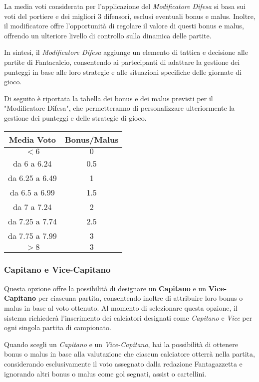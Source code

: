 \documentclass[12pt]{article}
\begin{document}
La media voti considerata per l'applicazione del \textit{Modificatore Difesa} si basa sui voti del portiere e dei migliori 3 difensori, esclusi eventuali bonus e malus. Inoltre, il modificatore offre l'opportunità di regolare il valore di questi bonus e malus, offrendo un ulteriore livello di controllo sulla dinamica delle partite.

In sintesi, il \textit{Modificatore Difesa} aggiunge un elemento di tattica e decisione alle partite di Fantacalcio, consentendo ai partecipanti di adattare la gestione dei punteggi in base alle loro strategie e alle situazioni specifiche delle giornate di gioco.

Di seguito è riportata la tabella dei bonus e dei malus previsti per il "Modificatore Difesa", che permetteranno di personalizzare ulteriormente la gestione dei punteggi e delle strategie di gioco.
\newline
\\
\begin{tabular}{|c|c|}
    \hline
    \textbf{Media Voto} & \textbf{Bonus/Malus} \\
    \hline
    $ < 6 $ & $ 0 $ \\
    \hline
    da 6 a 6.24 & 0.5 \\
    \hline
    da 6.25 a 6.49 & 1 \\
    \hline
    da 6.5 a 6.99 & 1.5 \\
    \hline
    da 7 a 7.24 & 2 \\
    \hline
    da 7.25 a 7.74 & 2.5 \\
    \hline
    da 7.75 a 7.99 & 3 \\
    \hline
    $ > 8 $ & $ 3 $ \\
    \hline
  \end{tabular}
\newline 

\subsubsection{Capitano e Vice-Capitano}
Questa opzione offre la possibilità di designare un \textbf{Capitano} e un \textbf{Vice-Capitano} per ciascuna partita, consentendo inoltre di attribuire loro bonus o malus in base al voto ottenuto. Al momento di selezionare questa opzione, il sistema richiederà l'inserimento dei calciatori designati come \textit{Capitano} e \textit{Vice} per ogni singola partita di campionato.

Quando scegli un \textit{Capitano} e un \textit{Vice-Capitano}, hai la possibilità di ottenere bonus o malus in base alla valutazione che ciascun calciatore otterrà nella partita, considerando esclusivamente il voto assegnato dalla redazione Fantagazzetta e ignorando altri bonus o malus come gol segnati, assist o cartellini.
\end{document}
